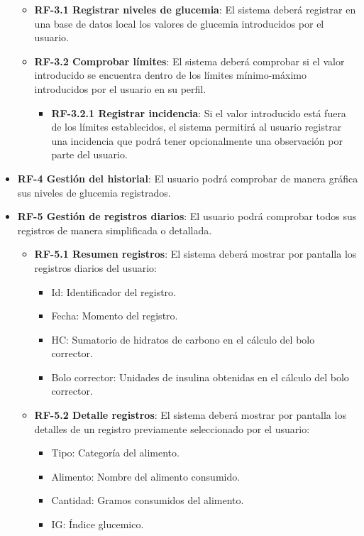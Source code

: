 \begin{itemize}
		\begin{itemize}
			\item \textbf{RF-3.1 Registrar niveles de glucemia}: El sistema deberá registrar en una base de datos local los valores de glucemia introducidos por el usuario.
			\item \textbf{RF-3.2 Comprobar límites}: El sistema deberá comprobar si el valor introducido se encuentra dentro de los límites mínimo-máximo introducidos por el usuario en su perfil.
				\begin{itemize}
					\item \textbf{RF-3.2.1 Registrar incidencia}: Si el valor introducido está fuera de los límites establecidos, el sistema permitirá al usuario registrar una incidencia que podrá tener opcionalmente una observación por parte del usuario.
				\end{itemize}
		\end{itemize}
	\item \textbf{RF-4 Gestión del historial}: El usuario podrá comprobar de manera gráfica sus niveles de glucemia registrados.
	\item \textbf{RF-5 Gestión de registros diarios}: El usuario podrá comprobar todos sus registros de manera simplificada o detallada.
		\begin{itemize}
			\item \textbf{RF-5.1 Resumen registros}: El sistema deberá mostrar por pantalla los registros diarios del usuario:
				\begin{itemize}
					\item Id: Identificador del registro.
					\item Fecha:  Momento del registro.
					\item HC: Sumatorio de hidratos de carbono en el cálculo del bolo corrector.
					\item Bolo corrector: Unidades de insulina obtenidas en el cálculo del bolo corrector.
				\end{itemize}
			\item \textbf{RF-5.2 Detalle registros}: El sistema deberá mostrar por pantalla los detalles de un registro previamente seleccionado por el usuario:
			\begin{itemize}
					\item Tipo: Categoría del alimento.
					\item Alimento: Nombre del alimento consumido.
					\item Cantidad: Gramos consumidos del alimento.
					\item IG: Índice glucemico.

\end{itemize}
\end{itemize}
\end{itemize}
